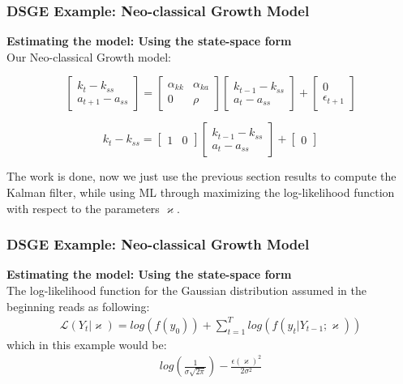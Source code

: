\documentclass[notes=show]{beamer}%
\begin{document}
\begin{frame}

\frametitle{DSGE Example: Neo-classical Growth Model}
\textbf{Estimating the model: Using the state-space form} \\
\bigskip
Our Neo-classical Growth model:

\begin{equation*}
\begin{bmatrix}
k_{t} - k_{ss} \\
a_{t+1}-a_{ss} 
\end{bmatrix}	
 = 
\begin{bmatrix}
\alpha_{kk} & \alpha_{ka} \\
0 & \rho  
\end{bmatrix}	
\begin{bmatrix}
k_{t-1} - k_{ss}\\
a_{t}-a_{ss}   
\end{bmatrix}	
+
\begin{bmatrix}
0\\
\epsilon_{t+1}   
\end{bmatrix}
\end{equation*}


\begin{equation*}
k_{t} - k_{ss}
= 
\begin{bmatrix}
1 & 0  
\end{bmatrix}	
\begin{bmatrix}
k_{t-1} - k_{ss}\\
a_{t}-a_{ss}   
\end{bmatrix}	
+
\begin{bmatrix}
0
\end{bmatrix}
\end{equation*}

The work is done, now we just use the previous section results to compute the Kalman filter, while using ML through maximizing the log-likelihood function with respect to the parameters $\varkappa$.

\end{frame}

\begin{frame}

\frametitle{DSGE Example: Neo-classical Growth Model}
\textbf{Estimating the model: Using the state-space form} \\

The log-likelihood function for the Gaussian distribution assumed in the beginning reads as following:
\begin{align}
\mathcal{L}(Y_{t}|\varkappa) = log (f(y_{0}))+ \sum_{t=1}^{T} log (f(y_{t}|Y_{t-1};\varkappa))
\end{align}
which in this example would be:
\begin{align}
log\left(\frac{1}{\sigma \sqrt{2\pi}}\right) - \frac{\epsilon(\varkappa)^2}{2\sigma^2}
\end{align}
\end{frame}
\end{document}
